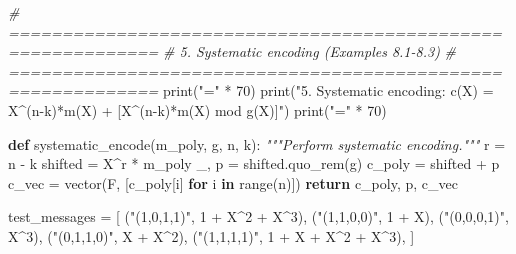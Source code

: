 \documentclass[
]{article}
\newenvironment{Shaded}{}{}
\newcommand{\BuiltInTok}[1]{\textcolor[rgb]{0.00,0.50,0.00}{#1}}
\newcommand{\CommentTok}[1]{\textcolor[rgb]{0.38,0.63,0.69}{\textit{#1}}}
\newcommand{\ControlFlowTok}[1]{\textcolor[rgb]{0.00,0.44,0.13}{\textbf{#1}}}
\newcommand{\DecValTok}[1]{\textcolor[rgb]{0.25,0.63,0.44}{#1}}
\newcommand{\KeywordTok}[1]{\textcolor[rgb]{0.00,0.44,0.13}{\textbf{#1}}}
\newcommand{\NormalTok}[1]{#1}
\newcommand{\OperatorTok}[1]{\textcolor[rgb]{0.40,0.40,0.40}{#1}}
\newcommand{\StringTok}[1]{\textcolor[rgb]{0.25,0.44,0.63}{#1}}
\begin{document}
\begin{Shaded}
\begin{Highlighting}[]
\CommentTok{\# ============================================================}
\CommentTok{\# 5. Systematic encoding (Examples 8.1{-}8.3)}
\CommentTok{\# ============================================================}
\BuiltInTok{print}\NormalTok{(}\StringTok{"="} \OperatorTok{*} \DecValTok{70}\NormalTok{)}
\BuiltInTok{print}\NormalTok{(}\StringTok{"5. Systematic encoding: c(X) = X\^{}(n{-}k)*m(X) + [X\^{}(n{-}k)*m(X) mod g(X)]"}\NormalTok{)}
\BuiltInTok{print}\NormalTok{(}\StringTok{"="} \OperatorTok{*} \DecValTok{70}\NormalTok{)}

\KeywordTok{def}\NormalTok{ systematic\_encode(m\_poly, g, n, k):}
    \CommentTok{"""Perform systematic encoding."""}
\NormalTok{    r }\OperatorTok{=}\NormalTok{ n }\OperatorTok{{-}}\NormalTok{ k}
\NormalTok{    shifted }\OperatorTok{=}\NormalTok{ X}\OperatorTok{\^{}}\NormalTok{r }\OperatorTok{*}\NormalTok{ m\_poly}
\NormalTok{    \_, p }\OperatorTok{=}\NormalTok{ shifted.quo\_rem(g)}
\NormalTok{    c\_poly }\OperatorTok{=}\NormalTok{ shifted }\OperatorTok{+}\NormalTok{ p}
\NormalTok{    c\_vec }\OperatorTok{=}\NormalTok{ vector(F, [c\_poly[i] }\ControlFlowTok{for}\NormalTok{ i }\KeywordTok{in} \BuiltInTok{range}\NormalTok{(n)])}
    \ControlFlowTok{return}\NormalTok{ c\_poly, p, c\_vec}

\NormalTok{test\_messages }\OperatorTok{=}\NormalTok{ [}
\NormalTok{    (}\StringTok{"(1,0,1,1)"}\NormalTok{, }\DecValTok{1} \OperatorTok{+}\NormalTok{ X}\OperatorTok{\^{}}\DecValTok{2} \OperatorTok{+}\NormalTok{ X}\OperatorTok{\^{}}\DecValTok{3}\NormalTok{),}
\NormalTok{    (}\StringTok{"(1,1,0,0)"}\NormalTok{, }\DecValTok{1} \OperatorTok{+}\NormalTok{ X),}
\NormalTok{    (}\StringTok{"(0,0,0,1)"}\NormalTok{, X}\OperatorTok{\^{}}\DecValTok{3}\NormalTok{),}
\NormalTok{    (}\StringTok{"(0,1,1,0)"}\NormalTok{, X }\OperatorTok{+}\NormalTok{ X}\OperatorTok{\^{}}\DecValTok{2}\NormalTok{),}
\NormalTok{    (}\StringTok{"(1,1,1,1)"}\NormalTok{, }\DecValTok{1} \OperatorTok{+}\NormalTok{ X }\OperatorTok{+}\NormalTok{ X}\OperatorTok{\^{}}\DecValTok{2} \OperatorTok{+}\NormalTok{ X}\OperatorTok{\^{}}\DecValTok{3}\NormalTok{),}
\NormalTok{]}


\end{Highlighting}
\end{Shaded}
\end{document}
